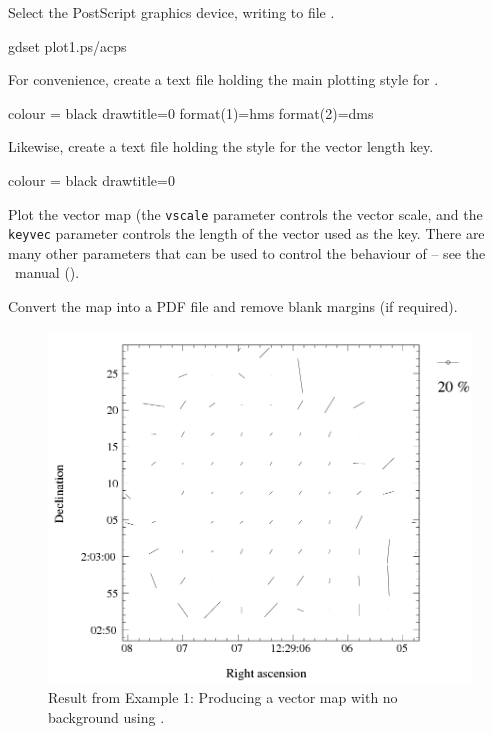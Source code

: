 Select the PostScript graphics device, writing to file .

\begin{terminalv}
gdset plot1.ps/acps
\end{terminalv}

For convenience, create a text file holding the main plotting style for
.

\begin{terminalv}
colour = black
drawtitle=0
format(1)=hms
format(2)=dms
\end{terminalv}

Likewise, create a text file holding the style for the vector length
key.

\begin{terminalv}
colour = black
drawtitle=0
\end{terminalv}


Plot the vector map (the \texttt{vscale} parameter controls the vector
scale, and the \texttt{keyvec} parameter controls the length of the
vector used as the key. There are many other parameters that can be
used to control the behaviour of  -- see the \polpack\
manual ().

\begin{terminalv}
\end{terminalv}

Convert the map into a PDF file and remove blank margins (if required).

\begin{terminalv}
\end{terminalv}


\begin{figure}[t!]
\begin{center}
\includegraphics[width=0.75\linewidth]{sc22-kappa-plots-plot1.png}
\caption [Vector map with polplot]{ Result from Example 1: Producing a
  vector map with no background using \task{polplot}.}
\label{fig:kappa-plot1}
\end{center}
\end{figure}

